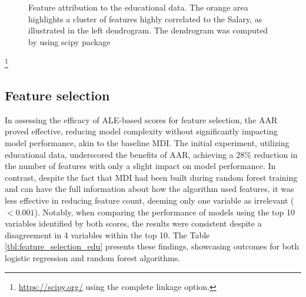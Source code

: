\begin{figure}[ht!]
\centering
  \caption{Feature attribution to the educational data. The orange area highlights a cluster of features highly correlated to the Salary, as illustrated in the left dendrogram. The dendrogram was computed by using scipy package}
    \label{fig:edu_data}
\end{figure}

\footnote{\url{https://scipy.org/} using the complete linkage option.}

\subsection{Feature selection}

In assessing the efficacy of \gls{ALE}-based scores for feature selection, the \gls{AAR} proved effective, reducing model complexity without significantly impacting model performance, akin to the baseline \gls{MDI}. The initial experiment, utilizing educational data, underscored the benefits of \gls{AAR}, achieving a 28\% reduction in the number of features with only a slight impact on model performance. In contrast, despite the fact that \gls{MDI} had been built during random forest training and can have the full information about how the algorithm used features, it was less effective in reducing feature count, deeming only one variable as irrelevant (\(< 0.001\)). Notably, when comparing the performance of models using the top 10 variables identified by both scores, the results were consistent despite a disagreement in 4 variables within the top 10. The Table \ref{tbl:feature_selection_edu} presents these findings, showcasing outcomes for both logistic regression and random forest algorithms.

